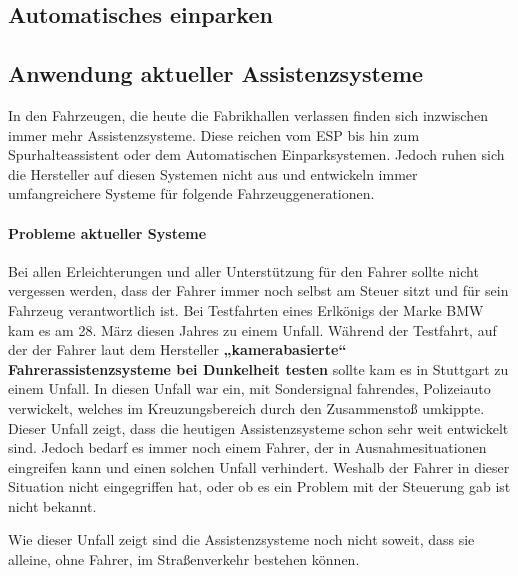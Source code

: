 \subsection{Automatisches einparken}

\subsection{Anwendung aktueller Assistenzsysteme}
In den Fahrzeugen, die heute die Fabrikhallen verlassen finden sich inzwischen immer mehr Assistenzsysteme. Diese reichen vom ESP bis hin zum Spurhalteassistent oder dem Automatischen Einparksystemen. Jedoch ruhen sich die Hersteller auf diesen Systemen nicht aus und entwickeln immer umfangreichere Systeme für folgende Fahrzeuggenerationen. 
\paragraph{Probleme aktueller Systeme} Bei allen Erleichterungen und aller Unterstützung für den Fahrer sollte nicht vergessen werden, dass der Fahrer immer noch selbst am Steuer sitzt und für sein Fahrzeug verantwortlich ist. Bei Testfahrten eines Erlkönigs der Marke BMW kam es am 28. März diesen Jahres zu einem Unfall. Während der Testfahrt, auf der der Fahrer laut dem Hersteller \textbf{„kamerabasierte“ Fahrerassistenzsysteme bei Dunkelheit testen} sollte kam es in Stuttgart zu einem Unfall. In diesen Unfall war ein, mit Sondersignal fahrendes, Polizeiauto verwickelt, welches im Kreuzungsbereich durch den Zusammenstoß umkippte.
Dieser Unfall zeigt, dass die heutigen Assistenzsysteme schon sehr weit entwickelt sind. Jedoch bedarf es immer noch einem Fahrer, der in Ausnahmesituationen eingreifen kann und einen solchen Unfall verhindert. Weshalb der Fahrer in dieser Situation nicht eingegriffen hat, oder ob es ein Problem mit der Steuerung gab ist nicht bekannt.

Wie dieser Unfall zeigt sind die Assistenzsysteme noch nicht soweit, dass sie alleine, ohne Fahrer, im Straßenverkehr bestehen können. 

